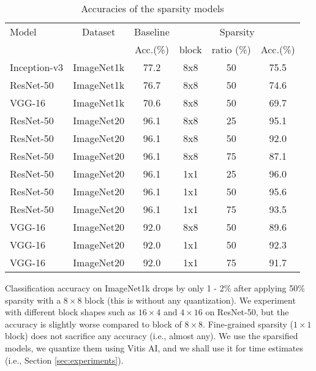 \documentclass[sigconf]{acmart}
\begin{document}
\begin{table}[ht]
\caption{Accuracies of the sparsity models}
\label{tab_acc}
\begin{center} 
\scalebox{0.9}
{
\begin{tabular}{|l|c|c|c|c|c|}
\hline
\rule[-1ex]{0pt}{3.5ex}  Model & Dataset & Baseline  & \multicolumn{3}{c|}{Sparsity}\\
\rule[-1ex]{0pt}{3.5ex}  {} & {} & Acc.(\%) & block & ratio (\%) & Acc.(\%)    \\\hline\hline
\rule[-1ex]{0pt}{3.5ex}  Inception-v3 & ImageNet1k & 77.2 & 8x8 & 50 & 75.5  \\\hline
\rule[-1ex]{0pt}{3.5ex}  ResNet-50 & ImageNet1k & 76.7 & 8x8 & 50 & 74.6  \\\hline
\rule[-1ex]{0pt}{3.5ex}  VGG-16    & ImageNet1k & 70.6 & 8x8 & 50 & 69.7  \\\hline \hline
\rule[-1ex]{0pt}{3.5ex}  ResNet-50 & ImageNet20 & 96.1 & 8x8 & 25 & 95.1  \\\hline
\rule[-1ex]{0pt}{3.5ex}  ResNet-50 & ImageNet20 & 96.1 & 8x8 & 50 & 92.0  \\\hline
\rule[-1ex]{0pt}{3.5ex}  ResNet-50 & ImageNet20 & 96.1 & 8x8 & 75 & 87.1  \\\hline
\rule[-1ex]{0pt}{3.5ex}  ResNet-50 & ImageNet20 & 96.1 & 1x1 & 25 & 96.0  \\\hline
\rule[-1ex]{0pt}{3.5ex}  ResNet-50 & ImageNet20 & 96.1 & 1x1 & 50 & 95.6  \\\hline
\rule[-1ex]{0pt}{3.5ex}  ResNet-50 & ImageNet20 & 96.1 & 1x1 & 75 & 93.5  \\\hline
\rule[-1ex]{0pt}{3.5ex}  VGG-16    & ImageNet20 & 92.0 & 8x8 & 50 & 89.6  \\\hline
\rule[-1ex]{0pt}{3.5ex}  VGG-16    & ImageNet20 & 92.0 & 1x1 & 50 & 92.3  \\\hline
\rule[-1ex]{0pt}{3.5ex}  VGG-16    & ImageNet20 & 92.0 & 1x1 & 75 & 91.7  \\\hline
\end{tabular}\vspace{-20pt}
}
\end{center}
\end{table}

Classification accuracy on ImageNet1k drops by only 1 - 2\% after
applying 50\% sparsity with a $8\times 8$ block (this is without any
quantization). We experiment with different block shapes such as
$16\times 4$ and $4\times 16$ on ResNet-50, but the accuracy is
slightly worse compared to block of $8\times 8$. Fine-grained sparsity
($1\times 1$ block) does not sacrifice any accuracy (i.e., almost
any).  We use the sparsified models, we quantize them using Vitis AI,
and we shall use it for time estimates (i.e., Section
\ref{sec:experiments}).
\end{document}
